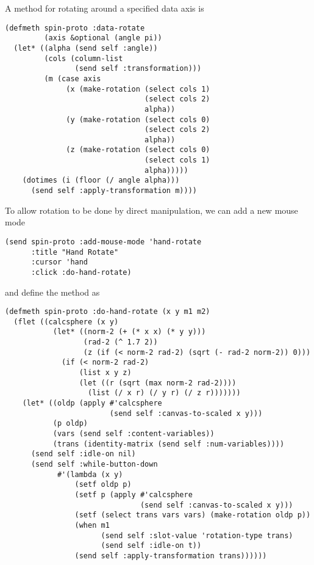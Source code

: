 \begin{slide}{}
A method for rotating around a specified data axis is
{\Large
\begin{verbatim}
(defmeth spin-proto :data-rotate
         (axis &optional (angle pi))
  (let* ((alpha (send self :angle))
         (cols (column-list
                (send self :transformation)))
         (m (case axis
              (x (make-rotation (select cols 1) 
                                (select cols 2)
                                alpha))
              (y (make-rotation (select cols 0)
                                (select cols 2)
                                alpha))
              (z (make-rotation (select cols 0)
                                (select cols 1)
                                alpha)))))
    (dotimes (i (floor (/ angle alpha)))
      (send self :apply-transformation m))))
\end{verbatim}}
\end{slide}

\begin{slide}{}
To allow rotation to be done by direct manipulation, we can add
a new mouse mode
{\Large
\begin{verbatim}
(send spin-proto :add-mouse-mode 'hand-rotate
      :title "Hand Rotate"
      :cursor 'hand
      :click :do-hand-rotate)
\end{verbatim}}
and define the  method as
{\normalsize
\begin{verbatim}
(defmeth spin-proto :do-hand-rotate (x y m1 m2)
  (flet ((calcsphere (x y)
           (let* ((norm-2 (+ (* x x) (* y y)))
                  (rad-2 (^ 1.7 2))
                  (z (if (< norm-2 rad-2) (sqrt (- rad-2 norm-2)) 0)))
             (if (< norm-2 rad-2) 
                 (list x y z)
                 (let ((r (sqrt (max norm-2 rad-2))))
                   (list (/ x r) (/ y r) (/ z r)))))))
    (let* ((oldp (apply #'calcsphere 
                        (send self :canvas-to-scaled x y)))
           (p oldp)
           (vars (send self :content-variables))
           (trans (identity-matrix (send self :num-variables))))
      (send self :idle-on nil)
      (send self :while-button-down 
            #'(lambda (x y) 
                (setf oldp p)
                (setf p (apply #'calcsphere 
                               (send self :canvas-to-scaled x y)))
                (setf (select trans vars vars) (make-rotation oldp p))
                (when m1 
                      (send self :slot-value 'rotation-type trans)
                      (send self :idle-on t))
                (send self :apply-transformation trans))))))
\end{verbatim}}
\end{slide}

